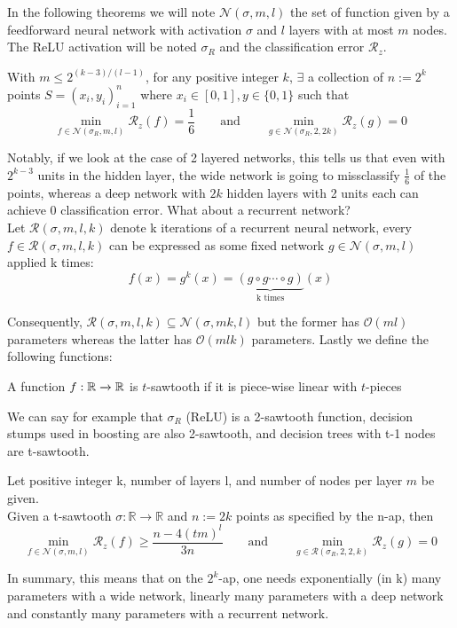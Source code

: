 \documentclass{article}
\begin{document}
In the following theorems we will note $\mathscr{N}(\sigma, m, l)$ the set of function given by a feedforward neural network with activation $\sigma$ and $l$ layers with at most $m$ nodes. The ReLU activation will be noted $\sigma_R$ and the classification error $\mathcal{R}_z$.

\begin{thm}
\label{thm:telgarskyffn}
With $m \leq 2^{(k-3)/(l-1)}$, for any positive integer $k$, $\exists$ a collection of $n:=2^k$ points $S = (x_i,y_i)^n_{i=1}$ where $x_i \in [0, 1], y \in \{0, 1\}$ such that \\
$$\min_{f\in\mathscr{N}(\sigma_R, m, l)} \mathcal{R}_z(f) = \frac{1}{6} \quad \quad \text{and} \quad \quad \min_{g\in\mathscr{N}(\sigma_R, 2, 2k)} \mathcal{R}_z(g) = 0$$
\end{thm}

Notably, if we look at the case of 2 layered networks, this tells us that even with $2^{k-3}$ units in the hidden layer, the wide network is going to missclassify $\frac{1}{6}$ of the points, whereas a deep network with $2k$ hidden layers with 2 units each can achieve 0 classification error. What about a recurrent network?  \\

Let $\mathscr{R}(\sigma, m, l, k)$ denote k iterations of a recurrent neural network, every $f \in \mathscr{R}(\sigma, m, l, k)$ can be expressed as some fixed network $g \in \mathscr{N}(\sigma, m, l)$ applied k times:
$$f(x) = g^k(x) = \underbrace{(g\circ g \cdots \circ g)}_\text{k times}(x)$$

Consequently, $\mathscr{R}(\sigma, m, l, k) \subseteq \mathscr{N}(\sigma, mk, l)$ but the former has $\mathcal{O}(ml)$ parameters whereas the latter has $\mathcal{O}(mlk)$ parameters. Lastly we define the following functions:

\begin{defn}[Sawtooth]
A function $f: \mathbb{R} \xrightarrow{} \mathbb{R}$ is $t$-sawtooth if it is piece-wise linear with $t$-pieces
\end{defn}
We can say for example that $\sigma_R$ (ReLU) is a 2-sawtooth function, decision stumps used in boosting are also 2-sawtooth, and decision trees with t-1 nodes are t-sawtooth.

\begin{thm}
\label{thm:telgarskyrec}
Let positive integer k, number of layers l, and number of nodes per layer $m$ be given. \\
Given a t-sawtooth $\sigma : \mathbb{R} \to \mathbb{R}$ and $n := 2k$ points as specified by the n-ap, then \\
$$\min_{f\in\mathscr{N}(\sigma, m, l)} \mathcal{R}_z(f) \geq \frac{n-4(tm)^l}{3n} \quad \quad \text{and} \quad \quad \min_{g\in\mathscr{R}(\sigma_R, 2, 2, k)} \mathcal{R}_z(g) = 0$$
\end{thm}
In summary, this means that on the $2^k$-ap, one needs exponentially (in k) many parameters with a wide network, linearly many parameters with a deep network and constantly many parameters with a recurrent network.
\end{document}
